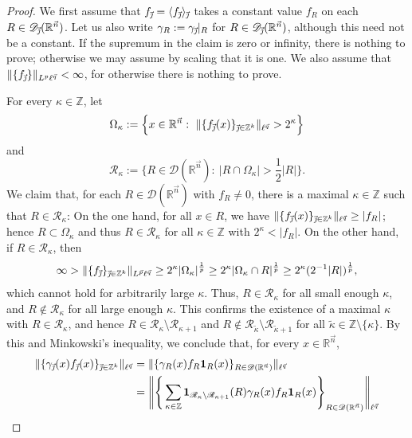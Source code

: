 \documentclass[11pt, reqno]{amsart}
\theoremstyle{definition}
\theoremstyle{remark}
\numberwithin{equation}{section}
\newcommand{\D}{\mathscr D}
\newcommand{\R}{\mathbb R}
\newcommand{\Rs}{\mathscr R}
\newcommand{\Z}{\mathbb Z}
\newcommand{\vj}{\vec{\textit{\j}}}
\newcommand{\vn}{\vec n}
\newcommand{\vp}{\vec p}
\newcommand{\vq}{\vec q}
\newcommand{\one}{\mathbf{1}}
\newcommand{\Avee}[2]{\langle#1\rangle_{#2}}
\newcommand{\abs}[1]{|#1|}
\newcommand{\Norm}[2]{\|#1\|_{#2}}
\begin{document}
\begin{proof}
We first assume that $f_{\vj}=\Avee{f_{\vj}}{\vj}$ takes a constant value $f_R$ on each $R\in\D_{\vj}(\R^{\vn})$. Let us also write $\gamma_R:=\gamma_{\vj}|_R$ for $R\in\D_{\vj}(\R^{\vn})$, although this need not be a constant. If the supremum in the claim is zero or infinity, there is nothing to prove; otherwise we may assume by scaling that it is one. We also assume that $\Norm{\{ f_{\vj}\}}{L^p\ell^{\vq}}<\infty$, for otherwise there is nothing to prove.

For every $\kappa\in\Z$, let
\begin{equation*}
\Omega_\kappa:=\Big\{x\in\R^{\vn}:\
\Norm{\{f_{\vj}(x)\}_{\vj\in\mathbb Z^k}}{\ell^{\vq}}>2^\kappa\Big\}
\end{equation*}
and
\begin{equation*}
\Rs_\kappa:=\Big\{R\in\D(\R^{\vn}):\
\abs{R\cap\Omega_\kappa}>\frac12\abs{R}\Big\}.
\end{equation*}
We claim that, for each $R\in\mathscr D(\R^{\vn})$ with $f_R\neq 0$, there is a maximal $\kappa\in\Z$ such that $R\in\Rs_\kappa$: On the one hand, for all $x\in R$, we have $\Norm{\{f_{\vj}(x)\}_{\vj\in\mathbb Z^k}}{\ell^{\vq}}\geq\abs{f_R}$; hence $R\subset\Omega_\kappa$ and thus $R\in\Rs_\kappa$ for all $\kappa\in\mathbb Z$ with $2^\kappa<\abs{f_R}$. On the other hand,
if $R\in\Rs_\kappa$, then
\begin{equation*}
\infty>\Norm{\{f_{\vj}\}_{\vj\in\mathbb Z^k}}{L^{\vp}\ell^{\vq}}
\geq 2^\kappa\abs{\Omega_\kappa}^{\frac 1p}
\geq 2^\kappa\abs{\Omega_\kappa\cap R}^{\frac 1p}
\geq 2^\kappa(2^{-1}\abs{R})^{\frac 1p},
\end{equation*}
which cannot hold for arbitrarily large $\kappa$.
Thus, $R\in\Rs_\kappa$ for all small enough $\kappa$, and $R\notin\Rs_\kappa$ for all large enough $\kappa$. This confirms the existence of a maximal $\kappa$ with $R\in\Rs_\kappa$, and hence $R\in\Rs_\kappa\setminus\Rs_{\kappa+1}$
and $R\notin\Rs_{\widetilde\kappa}\setminus\Rs_{\widetilde\kappa+1}$
for all $\widetilde\kappa\in\mathbb Z\setminus\{\kappa\}$.
By this and Minkowski's inequality, we conclude that,
for every $x\in\mathbb R^{\vec n}$,
\begin{align*}
\Norm{\{\gamma_{\vj}(x)f_{\vj}(x)\}_{\vj\in\mathbb Z^k}}{\ell^{\vq}}
&=\Norm{\{\gamma_{R}(x)f_{R}\one_R(x)\}_{R\in\D(\R^{\vn})}}{\ell^{\vq}} \\
&=\Bigg\|\Bigg\{\sum_{\kappa\in\Z}\one_{\Rs_\kappa\setminus\Rs_{\kappa+1}}(R)
\gamma_{R}(x)f_{R}\one_R(x)\Bigg\}_{R\in\D(\R^{\vn})} \Bigg\|_{\ell^{\vq}} \\

\end{align*}
\end{proof}
\end{document}
